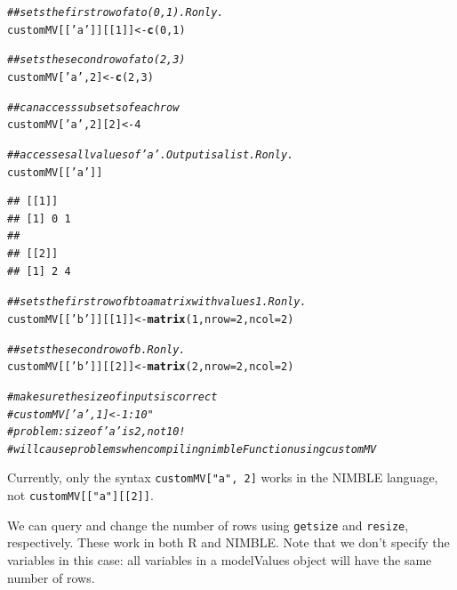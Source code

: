 \documentclass[12pt,oneside]{book}\usepackage[]{graphicx}\usepackage[]{color}
\makeatletter
\newcommand{\hlnum}[1]{\textcolor[rgb]{0.686,0.059,0.569}{#1}}%
\newcommand{\hlstr}[1]{\textcolor[rgb]{0.192,0.494,0.8}{#1}}%
\newcommand{\hlcom}[1]{\textcolor[rgb]{0.678,0.584,0.686}{\textit{#1}}}%
\newcommand{\hlstd}[1]{\textcolor[rgb]{0.345,0.345,0.345}{#1}}%
\newcommand{\hlkwb}[1]{\textcolor[rgb]{0.69,0.353,0.396}{#1}}%
\newcommand{\hlkwc}[1]{\textcolor[rgb]{0.333,0.667,0.333}{#1}}%
\newcommand{\hlkwd}[1]{\textcolor[rgb]{0.737,0.353,0.396}{\textbf{#1}}}%
\newenvironment{kframe}{%
 \def\at@end@of@kframe{}%
 \ifinner\ifhmode%
  \def\at@end@of@kframe{\end{minipage}}%
  \begin{minipage}{\columnwidth}%
 \fi\fi%
 \def\FrameCommand##1{\hskip\@totalleftmargin \hskip-\fboxsep
 \colorbox{shadecolor}{##1}\hskip-\fboxsep
     \hskip-\linewidth \hskip-\@totalleftmargin \hskip\columnwidth}%
 \MakeFramed {\advance\hsize-\width
   \@totalleftmargin\z@ \linewidth\hsize
   \@setminipage}}%
 {\par\unskip\endMakeFramed%
 \at@end@of@kframe}
\newenvironment{knitrout}{}{} %
\def\cd#1{\texttt{#1}}
\makeatother
\begin{document}
\begin{knitrout}
\color{fgcolor}\begin{kframe}
\begin{alltt}
\hlcom{## sets the first row of a to (0, 1).  R only.}
\hlstd{customMV[[}\hlstr{'a'}\hlstd{]][[}\hlnum{1}\hlstd{]]} \hlkwb{<-} \hlkwd{c}\hlstd{(}\hlnum{0}\hlstd{,}\hlnum{1}\hlstd{)}

\hlcom{## sets the second row of a to (2, 3)}
\hlstd{customMV[}\hlstr{'a'}\hlstd{,} \hlnum{2}\hlstd{]} \hlkwb{<-} \hlkwd{c}\hlstd{(}\hlnum{2}\hlstd{,}\hlnum{3}\hlstd{)}

\hlcom{## can access subsets of each row}
\hlstd{customMV[}\hlstr{'a'}\hlstd{,} \hlnum{2}\hlstd{][}\hlnum{2}\hlstd{]} \hlkwb{<-} \hlnum{4}

\hlcom{## accesses all values of 'a'. Output is a list.  R only.}
\hlstd{customMV[[}\hlstr{'a'}\hlstd{]]}
\end{alltt}
\begin{verbatim}
## [[1]]
## [1] 0 1
## 
## [[2]]
## [1] 2 4
\end{verbatim}
\begin{alltt}
\hlcom{## sets the first row of b to a matrix with values 1. R only.}
\hlstd{customMV[[}\hlstr{'b'}\hlstd{]][[}\hlnum{1}\hlstd{]]} \hlkwb{<-} \hlkwd{matrix}\hlstd{(}\hlnum{1}\hlstd{,} \hlkwc{nrow} \hlstd{=} \hlnum{2}\hlstd{,} \hlkwc{ncol} \hlstd{=} \hlnum{2}\hlstd{)}

\hlcom{## sets the second row of b.  R only.}
\hlstd{customMV[[}\hlstr{'b'}\hlstd{]][[}\hlnum{2}\hlstd{]]} \hlkwb{<-} \hlkwd{matrix}\hlstd{(}\hlnum{2}\hlstd{,} \hlkwc{nrow} \hlstd{=} \hlnum{2}\hlstd{,} \hlkwc{ncol} \hlstd{=} \hlnum{2}\hlstd{)}

\hlcom{# make sure the size of inputs is correct}
\hlcom{# customMV['a', 1] <- 1:10  "}
\hlcom{# problem: size of 'a' is 2, not 10!}
\hlcom{# will cause problems when compiling nimbleFunction using customMV}
\end{alltt}
\end{kframe}
\end{knitrout}

Currently, only the syntax \cd{customMV["a", 2]} works in the NIMBLE
language, not \cd{customMV[["a"][[2]]}. 

We can query and change the number of rows using \cd{getsize} and
\cd{resize}, respectively.  These work in both R and NIMBLE.  Note
that we don't specify the variables in this case: all variables in a
modelValues object will have the same number of rows.
  
\end{document}

